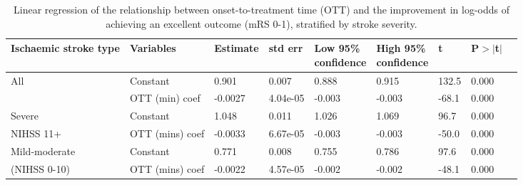 \begin{table}[!ht]
    \caption{Linear regression of the relationship between onset-to-treatment time (OTT) and the improvement in log-odds of achieving an excellent outcome (mRS 0-1), stratified by stroke severity.}
    \centering
    \begin{tabular}{lllllllll}
    \toprule
    Ischaemic stroke type & Variables & Estimate&  std err & \makecell{Low 95\%\\confidence} & \makecell{High 95\%\\confidence} & t & P$>$$|$t$|$ \\
    \midrule
    All & Constant & 0.901 & 0.007 & 0.888 & 0.915 & 132.5 & 0.000 \\
        & OTT (min) coef & -0.0027 & 4.04e-05 & -0.003 & -0.003 & -68.1 & 0.000 \\
    \midrule
    Severe & Constant & 1.048 & 0.011 & 1.026 & 1.069 & 96.7 & 0.000 \\
    NIHSS 11+ & OTT (mins) coef & -0.0033 & 6.67e-05 & -0.003 & -0.003 & -50.0 & 0.000 \\
    \midrule
    Mild-moderate & Constant & 0.771 & 0.008 & 0.755 & 0.786 & 97.6 & 0.000 \\
    (NIHSS 0-10) & OTT (mins) coef & -0.0022 & 4.57e-05 & -0.002 & -0.002 & -48.1 & 0.000 \\
    \bottomrule
    \end{tabular}
    \label{tab:stats_table_mrs1}
\end{table}


\FloatBarrier
